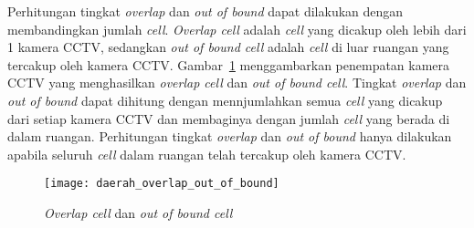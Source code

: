 Perhitungan tingkat \textit{overlap} dan \textit{out of bound} dapat dilakukan dengan membandingkan jumlah \textit{cell}. \textit{Overlap cell} adalah \textit{cell} yang dicakup oleh lebih dari 1 kamera CCTV, sedangkan \textit{out of bound cell} adalah \textit{cell} di luar ruangan yang tercakup oleh kamera CCTV. Gambar~\ref{fig:daerah_overlap_out_of_bound} menggambarkan penempatan kamera CCTV yang menghasilkan \textit{overlap cell} dan \textit{out of bound cell}. Tingkat \textit{overlap} dan \textit{out of bound} dapat dihitung dengan mennjumlahkan semua \textit{cell} yang dicakup dari setiap kamera CCTV dan membaginya dengan jumlah \textit{cell} yang berada di dalam ruangan. Perhitungan tingkat \textit{overlap} dan \textit{out of bound} hanya dilakukan apabila seluruh \textit{cell} dalam ruangan telah tercakup oleh kamera CCTV.

\begin{figure}[h]
	\centering  
	\texttt{[image: daerah\_overlap\_out\_of\_bound]}
	\caption[\textit{Overlap cell} dan \textit{out of bound cell}]{\textit{Overlap cell} dan \textit{out of bound cell}}
	\label{fig:daerah_overlap_out_of_bound}
\end{figure}



